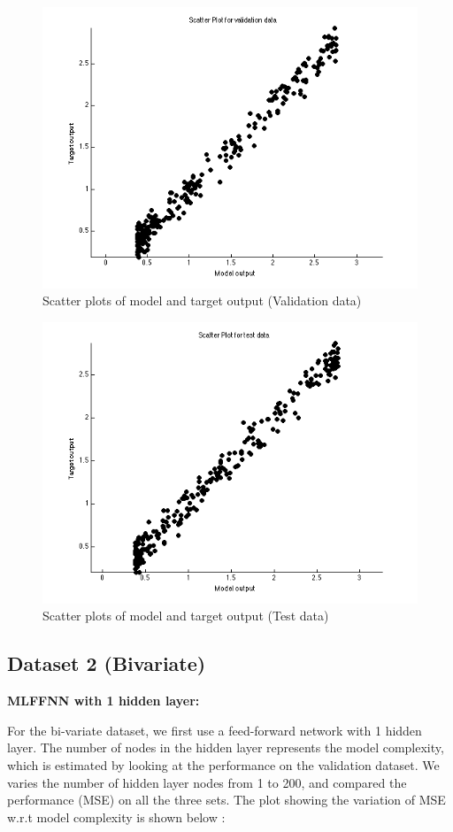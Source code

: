 \documentclass{article}
\begin{document}
\begin{figure}[H]
\centering
\includegraphics[width=0.5\linewidth]{Regression/rbfnn_univariate/scatter_val.png}
\caption{Scatter plots of model and target output (Validation data)}
\end{figure}

\begin{figure}[H]
\centering
\includegraphics[width=0.5\linewidth]{Regression/rbfnn_univariate/scatter_test.png}
\caption{Scatter plots of model and target output (Test data)}
\end{figure}











\subsection{Dataset 2 (Bivariate)}

\textbf{MLFFNN with 1 hidden layer:}

For the bi-variate dataset, we first use a feed-forward network with 1 hidden layer. The number of nodes in the hidden layer represents the model complexity, which is estimated by looking at the performance on the validation dataset. We varies the number of hidden layer nodes from 1 to 200, and compared the performance (MSE) on all the three sets. The plot showing the variation of MSE w.r.t model complexity is shown below :
\end{document}
